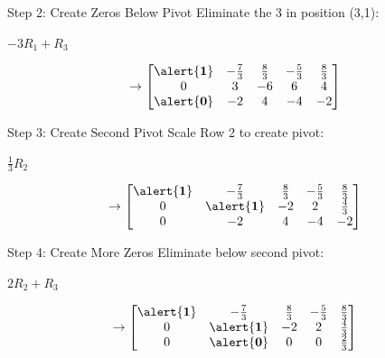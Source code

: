 \documentclass[aspectratio=169,xcolor=dvipsnames,svgnames,x11names,fleqn]{beamer}
\begin{document}
\begin{frame}{Step 2: Create Zeros Below Pivot}
\centering
Eliminate the 3 in position (3,1):

\vspace{3mm}
$-3R_1 + R_3$

\vspace{3mm}
$$
\rightarrow \begin{bmatrix}
\alert{\mathbf{1}} & -\frac{7}{3} & \frac{8}{3} & -\frac{5}{3} & \frac{8}{3} \\
0 & 3 & -6 & 6 & 4 \\
\alert{\mathbf{0}} & -2 & 4 & -4 & -2 \\
\end{bmatrix}
$$
\end{frame}

\begin{frame}{Step 3: Create Second Pivot}
\centering
Scale Row 2 to create pivot:

\vspace{3mm}
$\frac{1}{3}R_2$

\vspace{3mm}
$$
\rightarrow \begin{bmatrix}
\alert{\mathbf{1}} & -\frac{7}{3} & \frac{8}{3} & -\frac{5}{3} & \frac{8}{3} \\
0 & \alert{\mathbf{1}} & -2 & 2 & \frac{4}{3} \\
0 & -2 & 4 & -4 & -2 \\
\end{bmatrix}
$$
\end{frame}

\begin{frame}{Step 4: Create More Zeros}
\centering
Eliminate below second pivot:

\vspace{3mm}
$2R_2 + R_3$

\vspace{3mm}
$$
\rightarrow \begin{bmatrix}
\alert{\mathbf{1}} & -\frac{7}{3} & \frac{8}{3} & -\frac{5}{3} & \frac{8}{3} \\
0 & \alert{\mathbf{1}} & -2 & 2 & \frac{4}{3} \\
0 & \alert{\mathbf{0}} & 0 & 0 & \frac{2}{3} \\
\end{bmatrix}
$$
\end{frame}
\end{document}
